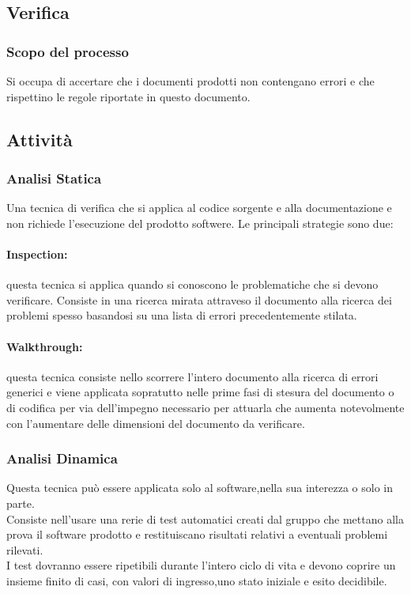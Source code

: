 \documentclass[../NormeDiProgetto.tex]{subfiles}
\begin{document}
		\subsection{Verifica}
		\subsubsection{Scopo del processo}
		Si occupa di accertare che i documenti prodotti non contengano errori e che rispettino le regole riportate in questo documento.
		
		\subsection{Attività}
		\subsubsection{Analisi Statica}Una tecnica di verifica che si applica al codice sorgente e alla documentazione e non richiede l'esecuzione del prodotto softwere. Le principali strategie sono due:
		\paragraph{Inspection:}	questa tecnica si applica quando si conoscono le problematiche che si devono verificare. Consiste in una ricerca mirata attraveso il documento alla ricerca dei problemi spesso basandosi su una lista di errori precedentemente stilata.
		\paragraph{Walkthrough:} questa tecnica consiste nello scorrere l'intero documento alla ricerca di errori generici e viene applicata sopratutto nelle prime fasi di stesura del documento o di codifica per via dell'impegno necessario per attuarla che aumenta notevolmente con l'aumentare delle dimensioni del documento da verificare.
		\subsubsection{Analisi Dinamica}
		Questa tecnica può essere applicata solo al software,nella sua interezza o solo in parte.\\ Consiste nell'usare una rerie di test automatici creati dal gruppo che mettano alla prova il software prodotto e restituiscano risultati relativi a eventuali problemi rilevati.\\
		I test dovranno essere ripetibili durante l'intero ciclo di vita e devono coprire un insieme finito di casi, con valori di ingresso,uno stato iniziale e esito decidibile.	
		
\end{document}
